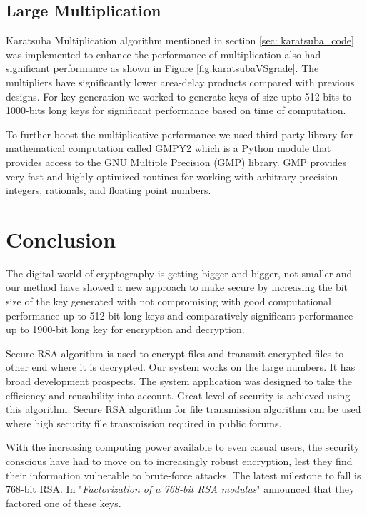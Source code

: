\documentclass[12pt,journal,compsoc]{IEEEtran}
\begin{document}
\subsection{{Large Multiplication}}
Karatsuba Multiplication\cite{karatsuba_multiplication} algorithm mentioned in section \ref{sec: karatsuba_code} was implemented to enhance the performance of multiplication also had significant performance as shown in Figure \ref{fig:karatsubaVSgrade}. The multipliers have significantly lower area-delay products compared with previous designs\cite{karatsuba_multiplication}. For key generation we worked to generate keys of size upto 512-bits to 1000-bits long keys for significant performance based on time of computation.

To further boost the multiplicative performance we used third party library for mathematical computation called GMPY2\cite{gmpy2} which is a Python module that provides access to the GNU Multiple Precision (GMP) library. GMP provides very fast and highly optimized routines for working with arbitrary precision integers, rationals, and floating point numbers.


\section{{Conclusion}}
The digital world of cryptography is getting bigger and bigger, not smaller and our method have showed a new approach to make secure by increasing the bit size of the key generated with not compromising with good computational performance up to 512-bit long keys and comparatively significant performance up to 1900-bit long key for encryption and decryption. 


Secure RSA algorithm is used to encrypt files and transmit encrypted files to other end where it is decrypted. Our system works on the large numbers. It has broad development prospects. The system application was designed to take the efficiency and reusability into account. Great level of security is achieved using this algorithm. Secure RSA algorithm for file transmission algorithm can be used where high security file transmission required in public forums.


With the increasing computing power available to even casual users, the security conscious have had to move on to increasingly robust encryption, lest they find their information vulnerable to brute-force attacks. The latest milestone to fall is 768-bit RSA. In "\emph{Factorization of a 768-bit RSA modulus}"\cite{768_key} announced that they factored one of these keys. 
\end{document}
